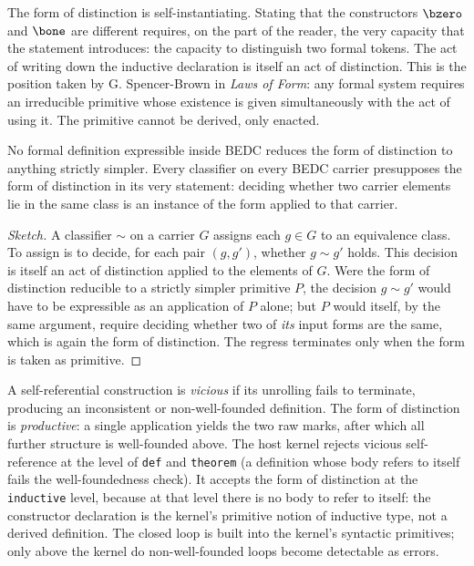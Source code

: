 \begin{remark}
\label{rem:form-self-instantiation}
The form of distinction is self-instantiating. Stating that the constructors $\bzero$ and $\bone$ are different requires, on the part of the reader, the very capacity that the statement introduces: the capacity to distinguish two formal tokens. The act of writing down the inductive declaration is itself an act of distinction. This is the position taken by G. Spencer-Brown in \emph{Laws of Form}: any formal system requires an irreducible primitive whose existence is given simultaneously with the act of using it. The primitive cannot be derived, only enacted.
\end{remark}

\begin{theorem}
\label{thm:form-of-distinction-irreducible}
No formal definition expressible inside BEDC reduces the form of distinction to anything strictly simpler. Every classifier on every BEDC carrier presupposes the form of distinction in its very statement: deciding whether two carrier elements lie in the same class is an instance of the form applied to that carrier.
\end{theorem}

\begin{proof}[Sketch]
A classifier $\sim$ on a carrier $G$ assigns each $g \in G$ to an equivalence class. To assign is to decide, for each pair $(g, g')$, whether $g \sim g'$ holds. This decision is itself an act of distinction applied to the elements of $G$. Were the form of distinction reducible to a strictly simpler primitive $P$, the decision $g \sim g'$ would have to be expressible as an application of $P$ alone; but $P$ would itself, by the same argument, require deciding whether two of \emph{its} input forms are the same, which is again the form of distinction. The regress terminates only when the form is taken as primitive.
\end{proof}

\begin{remark}
\label{rem:productive-vs-vicious-loop}
A self-referential construction is \emph{vicious} if its unrolling fails to terminate, producing an inconsistent or non-well-founded definition. The form of distinction is \emph{productive}: a single application yields the two raw marks, after which all further structure is well-founded above. The host kernel rejects vicious self-reference at the level of \texttt{def} and \texttt{theorem} (a definition whose body refers to itself fails the well-foundedness check). It accepts the form of distinction at the \texttt{inductive} level, because at that level there is no body to refer to itself: the constructor declaration is the kernel's primitive notion of inductive type, not a derived definition. The closed loop is built into the kernel's syntactic primitives; only above the kernel do non-well-founded loops become detectable as errors.
\end{remark}

